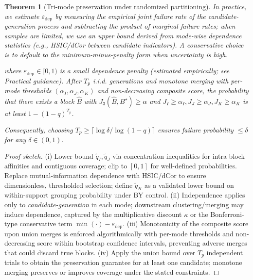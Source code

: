 \documentclass[unnumsec,webpdf,modern,large,namedate]{oup-authoring-template}%
\theoremstyle{thmstyleone}\newtheorem{theorem}{Theorem}
\theoremstyle{thmstyletwo}\newtheorem{example}{Example}
\theoremstyle{thmstylethree}\newtheorem{definition}{Definition}
\begin{document}
\begin{theorem}[Tri-mode preservation under randomized partitioning]
In practice, we estimate $\varepsilon_{\mathrm{dep}}$ by measuring the empirical joint failure rate of the candidate-generation process and subtracting the product of marginal failure rates; when samples are limited, we use an upper bound derived from mode-wise dependence statistics (e.g., HSIC/dCor between candidate indicators). A conservative choice is to default to the minimum-minus-penalty form when uncertainty is high.

where $\varepsilon_{\mathrm{dep}}\in[0,1)$ is a small dependence penalty (estimated empirically; see Practical guidance). After $T_p$ i.i.d. generations and monotone merging with per-mode thresholds $(\alpha_I,\alpha_J,\alpha_K)$ and non-decreasing composite score, the probability that there exists a block $\hat B$ with $J_3(\hat B,B^\star)\ge \alpha$ and $J_I\ge\alpha_I, J_J\ge\alpha_J, J_K\ge\alpha_K$ is at least $1-(1-q)^{T_p}$.

Consequently, choosing $T_p\ge \lceil \log\delta/\log(1-q)\rceil$ ensures failure probability $\le \delta$ for any $\delta\in(0,1)$.
\end{theorem}

\begin{proof}[Proof sketch]
(i) Lower-bound $\tilde q_I,\tilde q_J$ via concentration inequalities for intra-block affinities and contiguous coverage; clip to $[0,1]$ for well-defined probabilities. Replace mutual-information dependence with HSIC/dCor to ensure dimensionless, thresholded selection; define $\tilde q_K$ as a validated lower bound on within-support grouping probability under BY control.
(ii) Independence applies only to \emph{candidate-generation} in each mode; downstream clustering/merging may induce dependence, captured by the multiplicative discount $\kappa$ or the Bonferroni-type conservative term $\min(\cdot)-\varepsilon_{\mathrm{dep}}$.
(iii) Monotonicity of the composite score upon union merges is enforced algorithmically with per-mode thresholds and non-decreasing score within bootstrap confidence intervals, preventing adverse merges that could discard true blocks.
(iv) Apply the union bound over $T_p$ independent trials to obtain the preservation guarantee for at least one candidate; monotone merging preserves or improves coverage under the stated constraints.
\end{proof}
\end{document}
